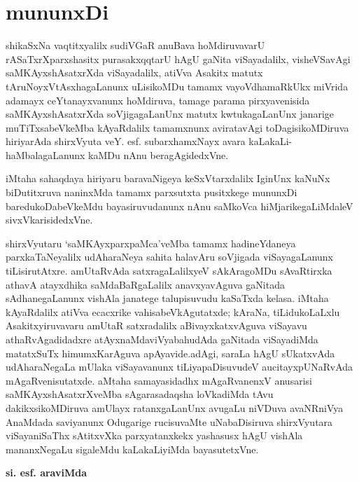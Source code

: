 \chapter*{mununxDi}
\vskip -20pt


shikaSxNa vaqtitxyalilx sudiVGaR anuBava hoMdiruvavarU rASaTxrXparxshasitx purasakxqqtarU hAgU gaNita viSayadalilx, visheVSavAgi saMKAyxshAsatxrXda viSayadalilx, atiVva Asakitx matutx tAruNoyxVtAsxhagaLanunx uLisikoMDu tamamx vayoVdhamaRkUkx  miVrida adamayx ceYtanayxvanunx hoMdiruva, tamage parama pirxyavenisida saMKAyxshAsatxrXda soVjigagaLanUnx matutx  kwtukagaLanUnx janarige muTiTxsabeVkeMba  kAyaRdalilx tamamxnunx aviratavAgi toDagisikoMDiruva hiriyarAda shirxVyuta veY. esf. subarxhamxNayx avara kaLakaLi-haMbalagaLanunx kaMDu nAnu beragAgidedxVne.

iMtaha  sahaqdaya hiriyaru baravaNigeya keSxVtarxdalilx IginUnx kaNuNx biDutitxruva naninxMda tamamx  parxsutxta pusitxkege mununxDi baredukoDabeVkeMdu bayasiruvudanunx nAnu saMkoVca hiMjarikegaLiMdaleV sivxVkarisidedxVne.

shirxVyutaru `saMKAyxparxpaMca'veMba tamamx hadineYdaneya parxkaTaNeyalilx udA\break haraNeya sahita halavAru soVjigada viSayagaLanunx tiLisirutAtxre. amUtaRvAda satxragaLalilxyeV  sAkAragoMDu sAvaRtirxka athavA atayxdhika saMdaBaRgaLalilx anavxya\break vAguva gaNitada  sAdhanegaLanunx vishAla janatege talupisuvudu kaSaTxda kelasa. iMtaha kAyaR\-dalilx  atiVva ecacxrike  vahisabeVkAgutatxde; kAraNa, tiLidukoLaLxlu Asakitxyiruva\-varu amUtaR satxradalilx aBivayxkatxvAguva viSayavu athaRvAgadidadxre atAyxnaMda\break viVyabahudAda gaNitada viSayadiMda  matatxSuTx himumxKarAguva apAyavide.\break adAgi, saraLa hAgU sUkatxvAda udAharaNegaLa mUlaka viSayavanunx tiLiya\break paDisuvudeV aucitayxpUNaRvAda mAgaRvenisutatxde. aMtaha samayasidadhx  mAgaR\break vanenxV anusarisi saMKAyxshAsatxrXveMba sAgarasadaqsha  loVkadiMda  tAvu dakikxsikoMDiruva amUlayx ratanxgaLanUnx  avugaLu niVDuva avaNRniVya AnaMdada saviyanunx Odugarige rucisuvaMte  uNabaDisiruva  shirxVyutara viSayaniSaThx  sAtitxvXka  parxyatanxkekx yashasusx  hAgU vishAla mananxNegaLu sigaleMdu kaLakaLiyiMda bayasutetxVne.
\begin{flushright}
{\bf si. esf. araviMda}
\end{flushright}
